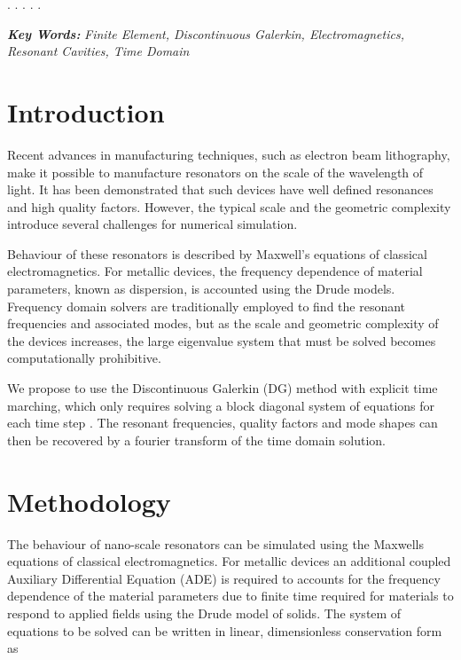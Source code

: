 \documentclass[times,11pt]{ACME2015article}
\begin{document}
\begin{normalsize}
.\newline
.\newline
.\newline
.\newline
.\newline

\textbf{\textit{Key Words:}} {\it Finite Element, Discontinuous Galerkin, Electromagnetics, Resonant Cavities, Time Domain }
%
\\
\section{Introduction}
Recent advances in manufacturing techniques, such as electron beam lithography, make it possible to manufacture resonators on the scale of the wavelength of light. It has been demonstrated that such devices have well defined resonances and high quality factors. However, the typical scale and the geometric complexity introduce several challenges for numerical simulation.

Behaviour of these resonators is described by Maxwell's equations of classical electromagnetics. For metallic devices, the frequency dependence of material parameters, known as dispersion, is accounted using the Drude models. Frequency domain solvers \cite{ref1} are traditionally employed to find the resonant frequencies and associated modes, but as the scale and geometric complexity of the devices increases, the large eigenvalue system that must be solved becomes computationally prohibitive.

We propose to use the Discontinuous Galerkin (DG) method with explicit time marching, which only requires solving a block diagonal system of equations for each time step \cite{ref2}. The resonant frequencies, quality factors and mode shapes can then be recovered by a fourier transform of the time domain solution.

\section{Methodology}
The behaviour of nano-scale resonators can be simulated using the Maxwells equations of classical electromagnetics. For metallic devices an additional coupled Auxiliary Differential Equation (ADE) is required to accounts for the frequency dependence of the material parameters due to finite time required for materials to respond to applied fields using the Drude model of solids. The system of equations to be solved can be written in linear, dimensionless conservation form as


\end{normalsize}
\end{document}
